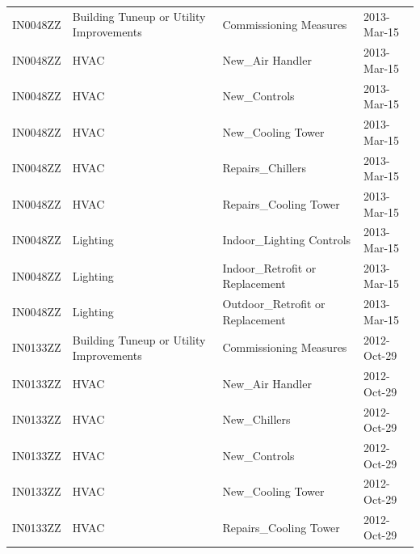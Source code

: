 \documentclass[12pt]{article}
\begin{document}
\begin{longtable}{lp{4cm}p{4cm}p{3cm}}
IN0048ZZ         & Building Tuneup or Utility Improvements & Commissioning Measures                    & 2013-Mar-15                   \\
IN0048ZZ         & HVAC                                    & New\_Air Handler                          & 2013-Mar-15                   \\
IN0048ZZ         & HVAC                                    & New\_Controls                             & 2013-Mar-15                   \\
IN0048ZZ         & HVAC                                    & New\_Cooling Tower                        & 2013-Mar-15                   \\
IN0048ZZ         & HVAC                                    & Repairs\_Chillers                         & 2013-Mar-15                   \\
IN0048ZZ         & HVAC                                    & Repairs\_Cooling Tower                    & 2013-Mar-15                   \\
IN0048ZZ         & Lighting                                & Indoor\_Lighting Controls                 & 2013-Mar-15                   \\
IN0048ZZ         & Lighting                                & Indoor\_Retrofit or Replacement           & 2013-Mar-15                   \\
IN0048ZZ         & Lighting                                & Outdoor\_Retrofit or Replacement          & 2013-Mar-15                   \\
IN0133ZZ         & Building Tuneup or Utility Improvements & Commissioning Measures                    & 2012-Oct-29                   \\
IN0133ZZ         & HVAC                                    & New\_Air Handler                          & 2012-Oct-29                   \\
IN0133ZZ         & HVAC                                    & New\_Chillers                             & 2012-Oct-29                   \\
IN0133ZZ         & HVAC                                    & New\_Controls                             & 2012-Oct-29                   \\
IN0133ZZ         & HVAC                                    & New\_Cooling Tower                        & 2012-Oct-29                   \\
IN0133ZZ         & HVAC                                    & Repairs\_Cooling Tower                    & 2012-Oct-29                   \\

\end{longtable}
\end{document}
